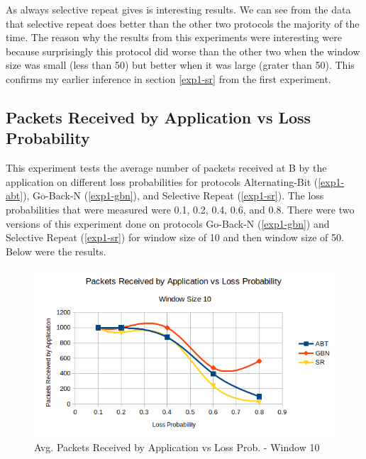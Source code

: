 \documentclass[10pt, a4paper]{article}
\begin{document}
        As always selective repeat gives is interesting results. We can see from the data that selective repeat does better than the other two protocols the majority of the time. The reason why the results from this experiments were interesting were because surprisingly this protocol did worse than the other two when the window size was small (less than 50) but better when it was large (grater than 50). This confirms my earlier inference in section \ref{exp1-sr} from the first experiment.
    
       

  \subsection{Packets Received by Application vs Loss Probability \label{exp3}}
	
	This experiment tests the average number of packets received at B by the application on different loss probabilities for protocols Alternating-Bit (\ref{exp1-abt}), Go-Back-N (\ref{exp1-gbn}), and Selective Repeat (\ref{exp1-sr}). The loss probabilities that were measured were 0.1, 0.2, 0.4, 0.6, and 0.8. There were two versions of this experiment done on protocols Go-Back-N (\ref{exp1-gbn}) and Selective Repeat (\ref{exp1-sr}) for window size of 10 and then window size of 50.  Below were the results.
	
	\begin{figure}[H]
        \includegraphics[width=\textwidth]{exp3-w10.png}
        \centering
        \caption{Avg. Packets Received by Application vs Loss Prob. -  Window 10 }
        \label{fig:exp3-w10}
    \end{figure}
    
\end{document}
